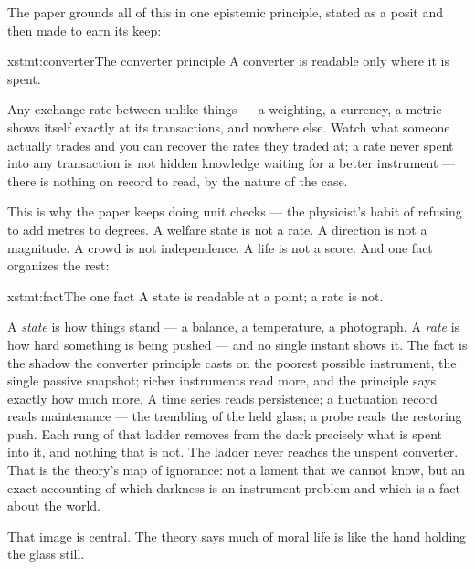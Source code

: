 \documentclass[../main_explainer]{subfiles}
\begin{document}
The paper grounds all of this in one epistemic principle, stated as a posit and then
made to earn its keep:

\begin{statement}{xstmt:converter}{The converter principle}
  A converter is readable only where it is spent.
\end{statement}

Any exchange rate between unlike things --- a weighting, a currency, a metric --- shows
itself exactly at its transactions, and nowhere else. Watch what someone actually trades
and you can recover the rates they traded at; a rate never spent into any transaction is
not hidden knowledge waiting for a better instrument --- there is nothing on record to
read, by the nature of the case.

This is why the paper keeps doing unit checks --- the physicist's habit of refusing to
add metres to degrees. A welfare state is not a rate. A direction is not a magnitude. A
crowd is not independence. A life is not a score. And one fact organizes the rest:

\begin{statement}{xstmt:fact}{The one fact}
  A state is readable at a point; a rate is not.
\end{statement}

A \emph{state} is how things stand --- a balance, a temperature, a photograph. A
\emph{rate} is how hard something is being pushed --- and no single instant shows it.
The fact is the shadow the converter principle casts on the poorest possible instrument,
the single passive snapshot; richer instruments read more, and the principle says
exactly how much more. A time series reads persistence; a fluctuation record reads
maintenance --- the trembling of the held glass; a probe reads the restoring push. Each
rung of that ladder removes from the dark precisely what is spent into it, and nothing
that is not. The ladder never reaches the unspent converter. That is the theory's map of
ignorance: not a lament that we cannot know, but an exact accounting of which darkness
is an instrument problem and which is a fact about the world.


That image is central. The theory says much of moral life is like the hand holding the
glass still.

\end{document}
